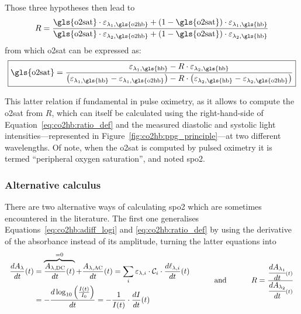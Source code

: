 Those three hypotheses then lead to
\begin{equation}\label{eq:co2hb:rr_defsao2}
	R= \frac{\text{\gls{o2sat}} \cdot \varepsilon_{\lambda_1,\text{\gls{o2hb}}} + (1-\text{\gls{o2sat}})\cdot \varepsilon_{\lambda_1,\text{\gls{hb}}}}{\text{\gls{o2sat}} \cdot \varepsilon_{\lambda_2,\text{\gls{o2hb}}} + (1-\text{\gls{o2sat}})\cdot \varepsilon_{\lambda_2,\text{\gls{hb}}}}
\end{equation}
from which \gls{o2sat} can be expressed as:
\begin{equation}\label{eq:co2hb:spo2_formulae}
	\boxed{
	\text{\gls{o2sat}} = \frac{\varepsilon_{\lambda_1,\text{\gls{hb}}} - R \cdot \varepsilon_{\lambda_2,\text{\gls{hb}}}}{\left(\varepsilon_{\lambda_1,\text{\gls{hb}}} - \varepsilon_{\lambda_1,\text{\gls{o2hb}}}\right) - R \cdot \left(\varepsilon_{\lambda_2,\text{\gls{hb}}} - \varepsilon_{\lambda_2,\text{\gls{o2hb}}}\right)}
	}
\end{equation}

This latter relation if fundamental in pulse oximetry, as it allows to compute the \gls{o2sat} from $R$, which can itself be calculated using the right-hand-side of Equation~\ref{eq:co2hb:ratio_def} and the measured diastolic and systolic light intensities---represented in Figure~\ref{fig:co2hb:ppg_principle}---at two different wavelengths. Of note, when the \gls{o2sat} is computed by pulsed oximetry it is termed \enquote{peripheral oxygen saturation}, and noted \gls{spo2}.

\subsubsection{Alternative calculus}

There are two alternative ways of calculating \gls{spo2} which are sometimes encountered in the literature. The first one generalises Equations~\ref{eq:co2hb:adiff_logi} and \ref{eq:co2hb:ratio_def} by using the derivative of the absorbance instead of its amplitude, \ie{} turning the latter equations into
\begin{equation}
	\begin{tabular}{ccc}
		$
		\begin{aligned}
			\frac{dA_\lambda}{dt}(t) &= \overbrace{\frac{A_{\lambda,\text{DC}}}{dt}(t)}^{=0} + \frac{A_{\lambda,\text{AC}}}{dt}(t) = \sum_{i} \varepsilon_{\lambda, i} \cdot \mathcal{C}_i \cdot \frac{d\ell_{\lambda, i}}{dt}(t)\\
			&= -\frac{d\log_{10}\left(\frac{I(t)}{I_0}\right)}{dt} = -\frac{1}{I(t)}\cdot \frac{dI}{dt}(t)
		\end{aligned}
		$ & \hspace{0.6cm} and \hspace{0.6cm} & $
		R = \frac{\cfrac{dA_{\lambda_1}}{dt}(t)}{ \cfrac{dA_{\lambda_2}}{dt}(t)}
		$
	\end{tabular}
\end{equation}

